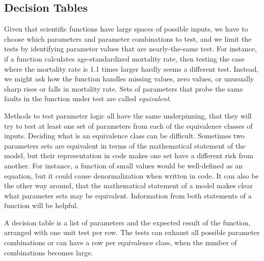 \documentclass[fleqn,10pt]{olplainarticle}
\begin{document}
\subsection{Decision Tables}\label{sec:parameter-decision}

Given that scientific functions have large spaces of possible inputs,
we have to choose which parameters and parameter
combinations to test, and we limit the tests by identifying
parameter values that are nearly-the-same test. For instance,
if a function calculates age-standardized mortality rate, then testing
the case where the mortality rate is 1.1 times larger hardly seems
a different test. Instead, we might ask how the function handles
missing values, zero values, or unusually sharp rises or falls in
mortality rate. Sets of parameters that probe the same faults in
the function under test are called \emph{equivalent.}

% 
Methods to test parameter logic all have the same underpinning,
that they will try to test at least one set of parameters from
each of the equivalence classes of inputs. Deciding what is an
equivalence class can be difficult. Sometimes two parameters
sets are equivalent in terms of the mathematical statement of 
the model, but their representation in code makes one set
have a different risk from another. For instance, a function of small
values would be well-defined as an equation, but it could cause
denormalization when written in code.
It can also be the other way around, that
the mathematical statement of a model makes clear what parameter
sets may be equivalent. Information from both statements of
a function will be helpful.

A decision table is a list of parameters and the expected result
of the function, arranged with one unit test per row. The
tests can exhaust all possible parameter combinations or
can have a row per equivalence class, when the number of combinations
becomes large.
\end{document}
